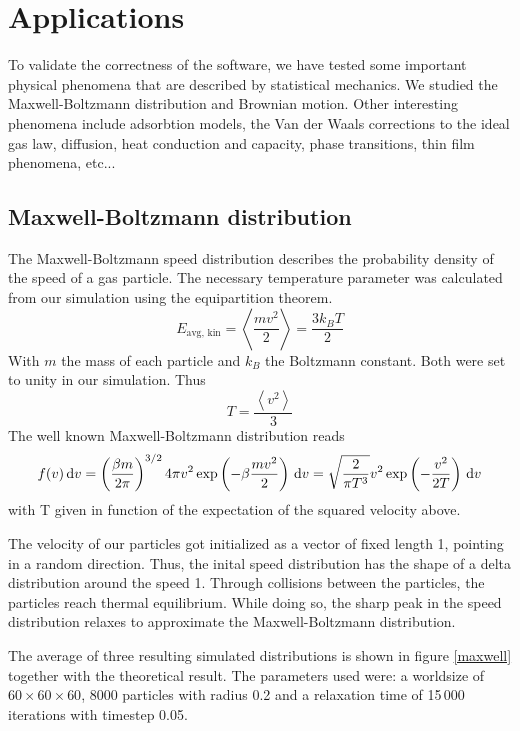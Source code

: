 \section{Applications}

To validate the correctness of the software, we have tested some important 
physical phenomena that are described by statistical mechanics. We studied 
the Maxwell-Boltzmann distribution and Brownian motion. Other interesting 
phenomena include adsorbtion models, the Van der Waals corrections to the 
ideal gas law, diffusion, heat conduction and capacity, phase transitions, 
thin film phenomena, etc...

\subsection{Maxwell-Boltzmann distribution}
The Maxwell-Boltzmann speed distribution describes the probability density of 
the speed of a gas particle. The necessary temperature parameter was calculated 
from our simulation using the equipartition theorem.
$$
E_{\textrm{avg, kin}} = \left< \frac{mv^2}{2} \right> = \frac{3k_BT}{2}
$$
With $m$ the mass of each particle and $k_B$ the Boltzmann constant. Both were 
set to unity in our simulation. Thus
$$
T = \frac{\left< v^2 \right>}{3}
$$
The well known Maxwell-Boltzmann distribution reads \cite{maxwellDist}
$$
f(v)\,\mathrm d v = \left( \frac{\beta m}{2 \pi} \right)^{3/2} 4 \pi v^2
\exp\left( -\beta \frac{mv^2}{2}\right) \,\mathrm d v =
\sqrt{ \frac{2}{\pi T^3} } v^2 \exp \left(-\frac{v^2}{2T}\right) \,\mathrm d v
$$
with T given in function of the expectation of the squared velocity above.

The velocity of our particles got initialized as a vector of fixed length 
1, pointing in a random direction. Thus, the inital speed distribution has 
the shape of a delta distribution around the speed 1. Through collisions 
between the particles, the particles reach thermal equilibrium. While doing 
so, the sharp peak in the speed distribution relaxes to approximate the 
Maxwell-Boltzmann distribution.



The average of three  resulting simulated distributions is shown in figure 
\ref{maxwell} together with the theoretical result. The parameters used 
were: a worldsize of $60 \times 60 \times 60$, 8000 particles with radius 
0.2 and a relaxation time of 15\,000 iterations with timestep 0.05.

